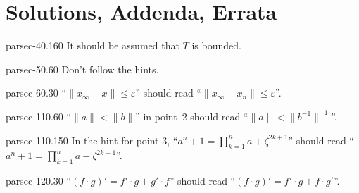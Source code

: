 \documentclass[b5page]{book}
\begin{document}
\appendix
\chapter{Solutions, Addenda, Errata}
\begin{erratum}{parsec-40.160}%
    It should be assumed that $T$ is bounded.
\end{erratum}
\begin{erratum}{parsec-50.60}%
Don't follow the hints.
\end{erratum}
\begin{erratum}{parsec-60.30}%
    ``$\|x_\infty-x\|\leq \varepsilon$'' should read  ``$\|x_\infty-x_n\|\leq\varepsilon$''.
\end{erratum}
\begin{erratum}{parsec-110.60}
``$\|a\| < \|b\|$'' in point~2
    should read ``$\|a\|<  \|b^{-1}\|^{-1}$''.
\end{erratum}
\begin{erratum}{parsec-110.150}
In the hint for point 3,
``$a^n+1 = \prod_{k=1}^n a+\zeta^{2k+1}$''
should read
``$a^n+1 = \prod_{k=1}^n a-\zeta^{2k+1}$''.
\end{erratum}
\begin{erratum}{parsec-120.30}
``$(f\cdot g)'=f'\cdot g + g'\cdot f$'' should
    read ``$(f\cdot g)' = f'\cdot g + f\cdot g'$''.
\end{erratum}
\end{document}
